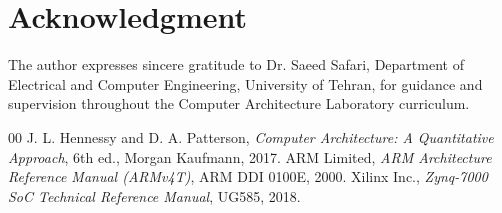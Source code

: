 \documentclass[conference]{IEEEtran}
\begin{document}
\section*{Acknowledgment}
The author expresses sincere gratitude to Dr. Saeed Safari, Department of Electrical and Computer Engineering, University of Tehran, for guidance and supervision throughout the Computer Architecture Laboratory curriculum.

\begin{thebibliography}{00}
 J. L. Hennessy and D. A. Patterson, \textit{Computer Architecture: A Quantitative Approach}, 6th ed., Morgan Kaufmann, 2017.
 ARM Limited, \textit{ARM Architecture Reference Manual (ARMv4T)}, ARM DDI 0100E, 2000.
 Xilinx Inc., \textit{Zynq-7000 SoC Technical Reference Manual}, UG585, 2018.
\end{thebibliography}
\end{document}
